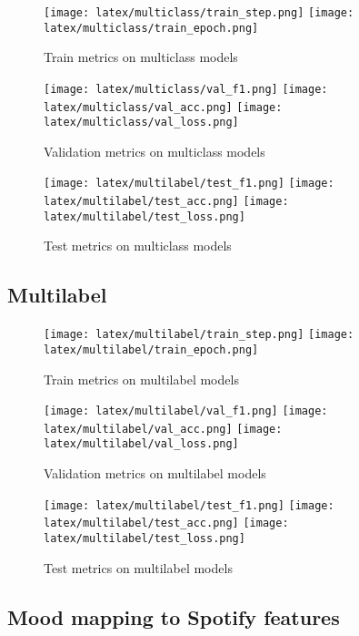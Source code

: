 \documentclass[11pt]{article}
\begin{document}
\begin{figure}[!ht]
    \centering
    \texttt{[image: latex/multiclass/train\_step.png]}
    \texttt{[image: latex/multiclass/train\_epoch.png]}
    \caption{Train metrics on multiclass models}
\end{figure}

\begin{figure}[!ht]
    \centering
    \texttt{[image: latex/multiclass/val\_f1.png]}
    \texttt{[image: latex/multiclass/val\_acc.png]}
    \texttt{[image: latex/multiclass/val\_loss.png]}
    
    \caption{Validation metrics on multiclass models}
\end{figure}

\begin{figure}[!ht]
    \centering
    \texttt{[image: latex/multilabel/test\_f1.png]}
    \texttt{[image: latex/multilabel/test\_acc.png]}
    \texttt{[image: latex/multilabel/test\_loss.png]}
    \caption{Test metrics on multiclass models}
\end{figure}

\clearpage

\subsection{Multilabel}

\begin{figure}[!ht]
    \centering
    \texttt{[image: latex/multilabel/train\_step.png]}
    \texttt{[image: latex/multilabel/train\_epoch.png]}
    \caption{Train metrics on multilabel models}
\end{figure}

\begin{figure}[!ht]
    \centering
    \texttt{[image: latex/multilabel/val\_f1.png]}
    \texttt{[image: latex/multilabel/val\_acc.png]}
    \texttt{[image: latex/multilabel/val\_loss.png]}
    
    \caption{Validation metrics on multilabel models}
\end{figure}

\begin{figure}[!ht]
    \centering
    \texttt{[image: latex/multilabel/test\_f1.png]}
    \texttt{[image: latex/multilabel/test\_acc.png]}
    \texttt{[image: latex/multilabel/test\_loss.png]}
    \caption{Test metrics on multilabel models}
\end{figure}

\subsection{Mood mapping to Spotify features}


\
\end{document}
